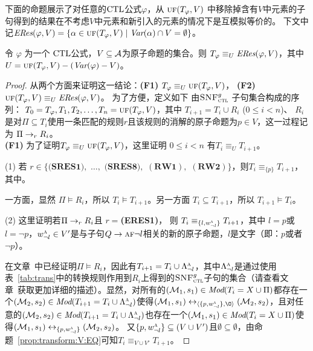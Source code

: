 下面的命题展示了对任意的$\textrm{CTL}$公式$\varphi$，从 $\textsc{uf}(T_\varphi,V)$ 中移除掉含有$V$中元素的子句得到的结果在不考虑$V$中元素和新引入的元素的情况下是互模拟等价的。
下文中记$\emph{ERes}(\varphi,V) = \{\alpha\in \textsc{uf}(T_\varphi,V)\mid \textit{Var}(\alpha)\cap V=\emptyset\}$。
\begin{proposition}\label{pro:resEQ}
	令 $\varphi$ 为一个 $\textrm{CTL}$公式，$V\subseteq\cal A$为原子命题的集合。则
	$T_\varphi \equiv_U\emph{ERes}(\varphi,V)$，其中  $U=\textsc{uf}(T_\varphi,V)-(\textit{Var}(\varphi)-  V)$。
\end{proposition}
	\begin{proof}
	从两个方面来证明这一结论：\textbf{(F1)} $T_\varphi \equiv_U \textsc{uf}(T_\varphi,V)$， \textbf{(F2)} $\textsc{uf}(T_\varphi,V) \equiv_{U} \emph{ERes}(\varphi,V)$。
	为了方便，定义如下 由${\textsc{SNF}_{\textsc{ctl}}^g}$ 子句集合构成的序列： $T_0=T_{\varphi}, T_1, T_2, \dots, T_n = \textsc{uf}(T_\varphi,V)$，其中
	$T_{i+1} = T_i \cup R_i$ ($0\leq i < n$)、 $R_i$ 是对$\Pi \subseteq T_i$使用一条匹配的规则$r$且该规则的消解的原子命题为$p\in V$，这一过程记为 $\Pi \rightarrow_r R_i$。
	\\
	
	\textbf{(F1)} 为了证明$T_\varphi \equiv_U \textsc{uf}(T_\varphi,V)$，这里证明 $0\leq i < n$ 有$T_i \equiv_{U} T_{i+1}$。
	
	
	
	(1) 若 $r\in \{\textbf{(SRES1)},$ $\dots,$ $\textbf{(SRES8)},$ $(\textbf{RW1}),$ $(\textbf{RW2})\}$，则$T_i \equiv_{\{p\}} T_{i+1}$，其中。
	
	
	一方面，显然 $\Pi \models R_i$，所以 $T_i \models T_{i+1}$。另一方面 $T_i\subseteq T_{i+1}$，所以 $T_{i+1} \models T_i$。
	
	(2) 这里证明若$\Pi \rightarrow_r R_i$且 $r=$\textbf{(ERES1)}，
	则 $T_i \equiv_{\{l, w_{\neg l}^{\textsc{a}}\}} T_{i+1}$，其中 $l = p$或 $l = \neg p$，$w_{\neg l}^{\textsc{a}}\in V'$是与子句$Q \rightarrow \textsc{a} \textsc{f} \neg l$相关的新的原子命题，$l$是文字（即：$p$或者$\neg p$）。
	
	在文章~\cite{bolotov2000clausal}中已经证明$\Pi \models R_i$，因此有$T_{i+1}=T_i \cup \Lambda_{\neg l}^{\textsc{a}}$，其中$\Lambda_{\neg l}^{\textsc{a}}$是通过使用表~\ref{tab:trans}中的转换规则作用到$R_i$上得到的${\textsc{SNF}_{\textsc{ctl}}^g}$子句的集合（请查看文章~\cite{zhang2009refined}获取更加详细的描述）。显然，对所有的$({\cal M}_1,s_1) \in \textit{Mod}(T_i= X \cup \Pi)$都存在一个$({\cal M}_2, s_2)\in \textit{Mod}(T_{i+1}=T_i \cup \Lambda_{\neg l}^{\textsc{a}})$使得$(\Hm_1, s_1) \lrto_{\tuple{\{p, w_{\neg l}^{\ALL}\}, {\O}}} (\Hm_2, s_2)$，且对任意的$({\cal M}_2, s_2)\in \textit{Mod}(T_{i+1}=T_i \cup \Lambda_{\neg l}^{\textsc{a}})$也存在一个$({\cal M}_1,s_1) \in \textit{Mod}(T_i= X \cup \Pi)$使得$({\cal M}_1, s_1) \leftrightarrow_{\{p, w_{\neg l}^{\textsc{a}}\}} ({\cal M}_2, s_2)$。
	又$\{p, w_{\neg l}^{\textsc{a}}\} \subseteq (V\cup V')$且$\emptyset \subseteq \emptyset$，由命题~\ref{prop:transform:V:EQ}可知$T_i \equiv_{V\cup V'} T_{i+1}$。
	

\end{proof}
